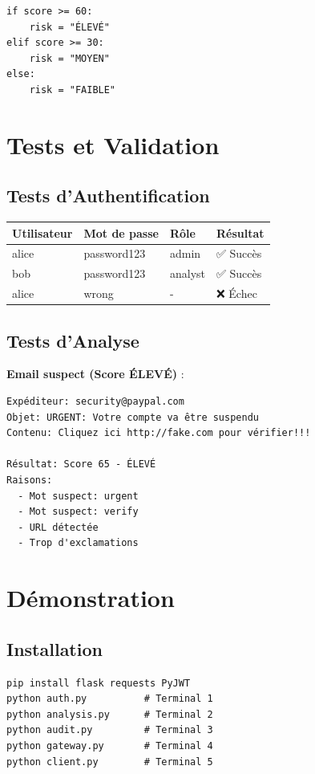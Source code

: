 \documentclass[12pt,a4paper]{article}
\begin{document}
\begin{lstlisting}[caption=Calcul du score]
if score >= 60:
    risk = "ÉLEVÉ"
elif score >= 30:
    risk = "MOYEN"
else:
    risk = "FAIBLE"
\end{lstlisting}

\section{Tests et Validation}

\subsection{Tests d'Authentification}

\begin{table}[H]
\centering
\begin{tabular}{|l|l|l|l|}
\hline
\textbf{Utilisateur} & \textbf{Mot de passe} & \textbf{Rôle} & \textbf{Résultat} \\
\hline
alice & password123 & admin & ✅ Succès \\
bob & password123 & analyst & ✅ Succès \\
alice & wrong & - & ❌ Échec \\
\hline
\end{tabular}
\end{table}

\subsection{Tests d'Analyse}

\textbf{Email suspect (Score ÉLEVÉ)} :
\begin{verbatim}
Expéditeur: security@paypal.com
Objet: URGENT: Votre compte va être suspendu
Contenu: Cliquez ici http://fake.com pour vérifier!!!

Résultat: Score 65 - ÉLEVÉ
Raisons: 
  - Mot suspect: urgent
  - Mot suspect: verify
  - URL détectée
  - Trop d'exclamations
\end{verbatim}

\section{Démonstration}

\subsection{Installation}

\begin{lstlisting}[caption=Commandes d'installation]
pip install flask requests PyJWT
python auth.py          # Terminal 1
python analysis.py      # Terminal 2
python audit.py         # Terminal 3
python gateway.py       # Terminal 4
python client.py        # Terminal 5
\end{lstlisting}
\end{document}
